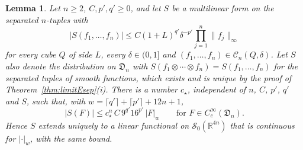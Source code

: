 \documentclass[aps,prd,twocolumn,superscriptaddress,nofootinbib,longbibliography,floatfix,amsmath,amssymb,10pt]{revtex4-2}
\newtheorem{lemma}[theorem]{Lemma}
\theoremstyle{definition}
\theoremstyle{remark}
\newcommand{\R}{\mathbb{R}}
\begin{document}
\begin{lemma}\label{lem:limitEextend}
Let $n\ge2$, $C,p',q'\ge0$, and let $S$ be a multilinear form on the separated
$n$-tuples with
\[
|S(f_1,\dots,f_n)|\le C(1+L)^{q'}\delta^{-p'}\prod_{j=1}^n\|f_j\|_\infty
\]
for every cube $Q$ of side $L$, every $\delta\in(0,1]$ and $(f_1,\dots,f_n)
\in\mathcal C_n(Q,\delta)$. Let $S$ also denote the distribution on
$\mathfrak D_n$ with $S(f_1\otimes\cdots\otimes f_n)=S(f_1,\dots,f_n)$ for
the separated tuples of smooth functions, which exists and is unique by the
proof of Theorem~\textup{\ref{thm:limitEsep}(i)}. There is a number $c_\star$,
independent of $n$, $C$, $p'$, $q'$ and $S$, such that, with
$w=\lceil q'\rceil+\lceil p'\rceil+12n+1$,
\[
|S(F)|\le c_\star^n\,C\,9^{q'}16^{p'}\,|F|_w\qquad\text{for }F\in
C^\infty_c(\mathfrak D_n).
\]
Hence $S$ extends uniquely to a linear functional on $\mathcal S_0(\R^{4n})$
that is continuous for $|\cdot|_w$, with the same bound.
\end{lemma}
\end{document}
